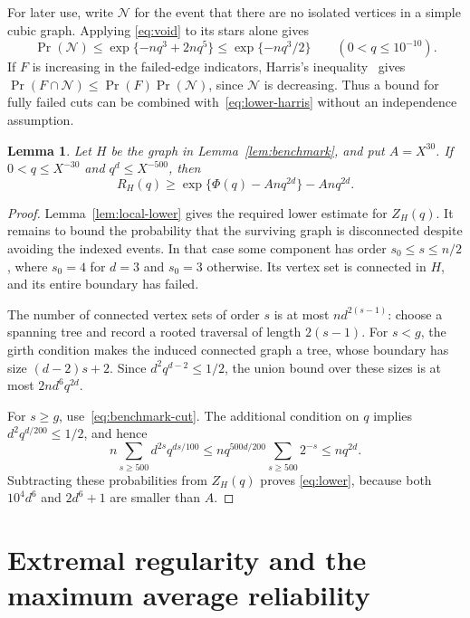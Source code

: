 \documentclass[11pt,reqno]{amsart}
\newtheorem{lemma}[theorem]{Lemma}
\theoremstyle{remark}
\numberwithin{equation}{section}
\begin{document}
For later use, write $\mathcal N$ for the event that there are no
isolated vertices in a simple cubic graph.  Applying
\eqref{eq:void} to its stars alone gives
\begin{equation}\label{eq:lower-harris}
 \Pr(\mathcal N)
 \le\exp\{-nq^3+2nq^5\}
 \le\exp\{-nq^3/2\}
 \qquad(0<q\le10^{-10}).
\end{equation}
If $F$ is increasing in the failed-edge indicators, Harris's
inequality~\cite{Harris} gives
$\Pr(F\cap\mathcal N)\le\Pr(F)\Pr(\mathcal N)$, since
$\mathcal N$ is decreasing.  Thus a bound for fully failed cuts
can be combined with~\eqref{eq:lower-harris} without an
independence assumption.

\begin{lemma}\label{lem:lower}
Let $H$ be the graph in Lemma~\ref{lem:benchmark}, and put
$A=X^{30}$.  If $0<q\le X^{-30}$ and $q^d\le X^{-500}$, then
\begin{equation}\label{eq:lower}
 R_H(q)\ge
 \exp\{\Phi(q)-Anq^{2d}\}-Anq^{2d}.
\end{equation}
\end{lemma}

\begin{proof}
Lemma~\ref{lem:local-lower} gives the required lower estimate for
$Z_H(q)$.  It remains to bound the probability that the surviving
graph is disconnected despite avoiding the indexed events.  In
that case some component has order $s_0\le s\le n/2$, where
$s_0=4$ for $d=3$ and $s_0=3$ otherwise.  Its vertex set is
connected in $H$, and its entire boundary has failed.

The number of connected vertex sets of order $s$ is at most
$nd^{2(s-1)}$: choose a spanning tree and record a rooted traversal
of length $2(s-1)$.  For $s<g$, the girth condition makes the
induced connected graph a tree, whose boundary has size
$(d-2)s+2$.  Since $d^2q^{d-2}\le1/2$, the union bound over
these sizes is at most $2nd^6q^{2d}$.

For $s\ge g$, use~\eqref{eq:benchmark-cut}.  The additional
condition on $q$ implies $d^2q^{d/200}\le1/2$, and hence
\[
 n\sum_{s\ge500}d^{2s}q^{ds/100}
 \le n q^{500d/200}\sum_{s\ge500}2^{-s}
 \le nq^{2d}.
\]
Subtracting these probabilities from $Z_H(q)$ proves
\eqref{eq:lower}, because both $10^4d^6$ and $2d^6+1$ are
smaller than $A$.
\end{proof}

\section{Extremal regularity and the maximum average reliability}
\label{sec:extrema}
\end{document}
